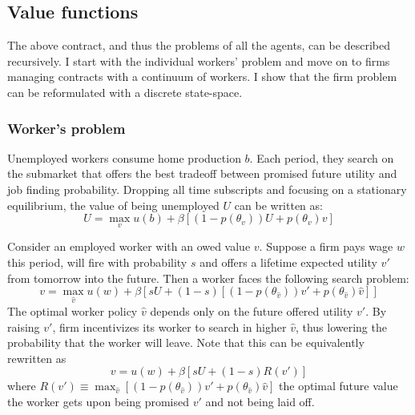 \subsection{Value functions}
The above contract, and thus the problems of all the agents, can be described recursively. I start with the individual workers' problem and move on to firms managing contracts with a continuum of workers. I show that the firm problem can be reformulated with a discrete state-space.
\subsubsection*{Worker's problem} %
Unemployed workers consume home production $b$. Each period, they search on the submarket that offers the best tradeoff between promised future utility and job finding probability. Dropping all time subscripts and focusing on a stationary equilibrium, the value of being unemployed $U$ can be written as:
\begin{equation} \label{unempproblem}
    U =\max_{v} u(b) + \beta[(1 - p(\theta_v))U + p(\theta_v)v]
\end{equation}

Consider an employed worker with an owed value $v$. Suppose a firm pays wage $w$ this period, will fire with probability $s$ and offers a lifetime expected utility $v'$ from tomorrow into the future. Then a worker faces the following search problem:
\begin{equation} \label{empproblem}
  v=\max_{\hat{v}} u(w) + \beta[sU + (1-s)[(1-p(\theta_{\hat{v}}))v'+p(\theta_{\hat{v}})\hat{v}]]   
\end{equation}
The optimal worker policy $\hat{v}$ depends only on the future offered utility $v'$. By raising $v'$, firm incentivizes its worker to search in higher $\hat{v}$, thus lowering the probability that the worker will leave.
Note that this can be equivalently rewritten as 
\begin{equation*}
  v=u(w) + \beta[sU + (1-s)R(v')]  
\end{equation*}
where $R(v') \equiv \max_{\hat{v}}[(1-p(\theta_{\hat{v}}))v'+p(\theta_{\hat{v}})\hat{v}]$ the optimal future value the worker gets upon being promised $v'$ and not being laid off.
